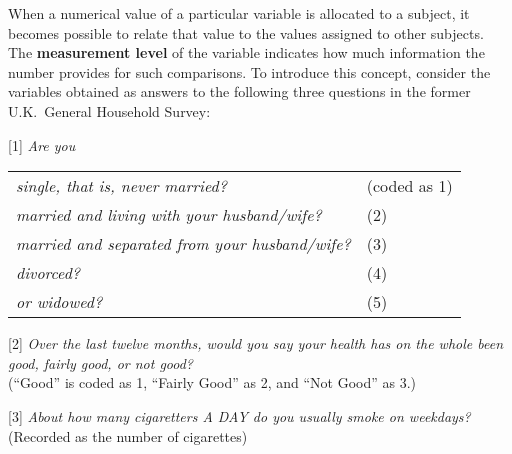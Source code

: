 When a numerical value of a particular variable is
allocated to a subject, it becomes possible to relate that value to
the values assigned to other subjects. The \textbf{measurement level} of the
variable indicates how much information the number provides for such
comparisons. To introduce this concept, consider the variables obtained
as answers to the following three questions in the former U.K.\ General
Household Survey:\label{p_varexample}

[1] \emph{Are you}\\
\begin{tabular}{ll}
\emph{single, that is, never married?} & (coded as 1)\\
\emph{married and living with your husband/wife?} & (2)\\
\emph{married and separated from your husband/wife?} & (3)\\
\emph{divorced?} & (4)\\
\emph{or widowed?} & (5)
\end{tabular}

[2] \emph{Over the last twelve months, would you say your health has on
the whole been good, fairly good, or not good?}\\
(``Good'' is coded as 1, ``Fairly Good'' as 2, and ``Not Good'' as 3.)

[3] \emph{About how many cigaretters A DAY do you usually smoke on
weekdays?}\\
(Recorded as the number of cigarettes)


